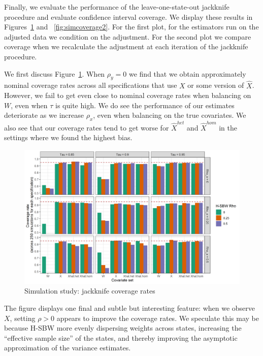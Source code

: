 Finally, we evaluate the performance of the leave-one-state-out jackknife procedure and evaluate confidence interval coverage. We display these results in Figures~\ref{fig:simcoverage1} and ~\ref{fig:simcoverage2}. For the first plot, for the estimators run on the adjusted data we condition on the adjustment. For the second plot we compare coverage when we recalculate the adjustment at each iteration of the jackknife procedure.

We first discuss Figure~\ref{fig:simcoverage1}. When $\rho_y = 0$ we find that we obtain approximately nominal coverage rates across all specifications that use $X$ or some version of $\hat{X}$. However, we fail to get even close to nominal coverage rates when balancing on $W$, even when $\tau$ is quite high. We do see the performance of our estimates deteriorate as we increase $\rho_x$, even when balancing on the true covariates. We also see that our coverage rates tend to get worse for $\hat{X}^{het}$ and $\hat{X}^{hom}$ in the settings where we found the highest bias.

\begin{figure}[H]
\begin{center}
    \caption{Simulation study: jackknife coverage rates}\label{fig:simcoverage1}
    \includegraphics[scale=0.5]{01_Plots/coverage-plot-1.png}
\end{center}
\end{figure}

The figure displays one final and subtle but interesting feature: when we observe $X$, setting $\rho > 0$ appears to improve the coverage rates. We speculate this may be because H-SBW more evenly dispersing weights across states, increasing the ``effective sample size'' of the states, and thereby improving the asymptotic approximation of the variance estimates. 

